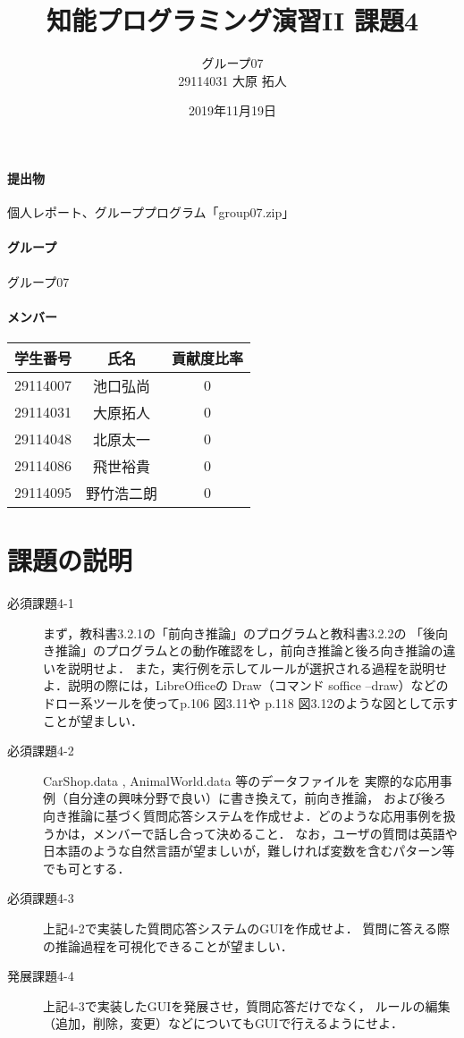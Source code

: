 \documentclass{jarticle}
\title{知能プログラミング演習II 課題4}
\author{グループ07\\
    29114031 大原 拓人\\
}
\date{2019年11月19日}
\begin{document}
\maketitle

\paragraph{提出物} 個人レポート、グループプログラム「group07.zip」
\paragraph{グループ} グループ07
\paragraph{メンバー}
\begin{tabular}{|c|c|c|}
    \hline
    学生番号&氏名&貢献度比率\\
    \hline\hline
    29114007&池口弘尚&0\\
    \hline
    29114031&大原拓人&0\\
    \hline
    29114048&北原太一&0\\
    \hline
    29114086&飛世裕貴&0\\
    \hline
    29114095&野竹浩二朗&0\\
    \hline
\end{tabular}

\section{課題の説明}
\begin{description}
    \item[必須課題4-1] まず，教科書3.2.1の「前向き推論」のプログラムと教科書3.2.2の
    「後向き推論」のプログラムとの動作確認をし，前向き推論と後ろ向き推論の違いを説明せよ．
    また，実行例を示してルールが選択される過程を説明せよ．説明の際には，LibreOfficeの
    Draw（コマンド soffice --draw）などのドロー系ツールを使ってp.106 図3.11や
    p.118 図3.12のような図として示すことが望ましい．
    \item[必須課題4-2] CarShop.data , AnimalWorld.data 等のデータファイルを
    実際的な応用事例（自分達の興味分野で良い）に書き換えて，前向き推論，
    および後ろ向き推論に基づく質問応答システムを作成せよ．どのような応用事例を扱うかは，メンバーで話し合って決めること．
    なお，ユーザの質問は英語や日本語のような自然言語が望ましいが，難しければ変数を含むパターン等でも可とする．
    \item[必須課題4-3] 上記4-2で実装した質問応答システムのGUIを作成せよ．
    質問に答える際の推論過程を可視化できることが望ましい．
    \item[発展課題4-4] 上記4-3で実装したGUIを発展させ，質問応答だけでなく，
    ルールの編集（追加，削除，変更）などについてもGUIで行えるようにせよ．
\end{description}
\end{document}
